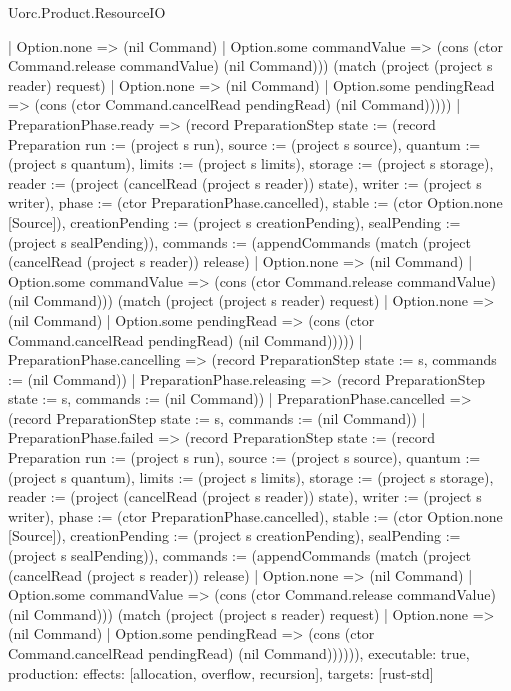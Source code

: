 \begin{lexlean}{Uorc.Product.ResourceIO}
\begin{semanticmodule}
{{      | Option.none => (nil Command)
      | Option.some commandValue => (cons (ctor Command.release commandValue) (nil Command))) (match (project (project s reader) request)
      | Option.none => (nil Command)
      | Option.some pendingRead => (cons (ctor Command.cancelRead pendingRead) (nil Command))))})
    | PreparationPhase.ready => (record PreparationStep {state := (record Preparation {run := (project s run), source := (project s source), quantum := (project s quantum), limits := (project s limits), storage := (project s storage), reader := (project (cancelRead (project s reader)) state), writer := (project s writer), phase := (ctor PreparationPhase.cancelled), stable := (ctor Option.none [Source]), creationPending := (project s creationPending), sealPending := (project s sealPending)}), commands := (appendCommands (match (project (cancelRead (project s reader)) release)
      | Option.none => (nil Command)
      | Option.some commandValue => (cons (ctor Command.release commandValue) (nil Command))) (match (project (project s reader) request)
      | Option.none => (nil Command)
      | Option.some pendingRead => (cons (ctor Command.cancelRead pendingRead) (nil Command))))})
    | PreparationPhase.cancelling => (record PreparationStep {state := s, commands := (nil Command)})
    | PreparationPhase.releasing => (record PreparationStep {state := s, commands := (nil Command)})
    | PreparationPhase.cancelled => (record PreparationStep {state := s, commands := (nil Command)})
    | PreparationPhase.failed => (record PreparationStep {state := (record Preparation {run := (project s run), source := (project s source), quantum := (project s quantum), limits := (project s limits), storage := (project s storage), reader := (project (cancelRead (project s reader)) state), writer := (project s writer), phase := (ctor PreparationPhase.cancelled), stable := (ctor Option.none [Source]), creationPending := (project s creationPending), sealPending := (project s sealPending)}), commands := (appendCommands (match (project (cancelRead (project s reader)) release)
      | Option.none => (nil Command)
      | Option.some commandValue => (cons (ctor Command.release commandValue) (nil Command))) (match (project (project s reader) request)
      | Option.none => (nil Command)
      | Option.some pendingRead => (cons (ctor Command.cancelRead pendingRead) (nil Command))))})),
  executable: true,
  production: {effects: [allocation, overflow, recursion], targets: [rust-std]}
}


\end{semanticmodule}
\end{lexlean}
